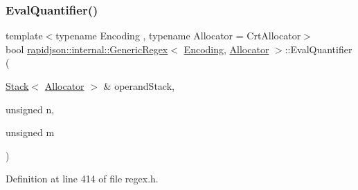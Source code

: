 \subsubsection{\texorpdfstring{EvalQuantifier()}{EvalQuantifier()}}
{\footnotesize\ttfamily template$<$typename Encoding , typename Allocator  = Crt\+Allocator$>$ \\
bool \mbox{\hyperlink{classrapidjson_1_1internal_1_1_generic_regex}{rapidjson\+::internal\+::\+Generic\+Regex}}$<$ \mbox{\hyperlink{classrapidjson_1_1_encoding}{Encoding}}, \mbox{\hyperlink{classrapidjson_1_1_allocator}{Allocator}} $>$\+::Eval\+Quantifier (\begin{DoxyParamCaption}\item[{\mbox{\hyperlink{classrapidjson_1_1internal_1_1_stack}{Stack}}$<$ \mbox{\hyperlink{classrapidjson_1_1_allocator}{Allocator}} $>$ \&}]{operand\+Stack,  }\item[{unsigned}]{n,  }\item[{unsigned}]{m }\end{DoxyParamCaption})\hspace{0.3cm}{\ttfamily [private]}}



Definition at line 414 of file regex.\+h.


